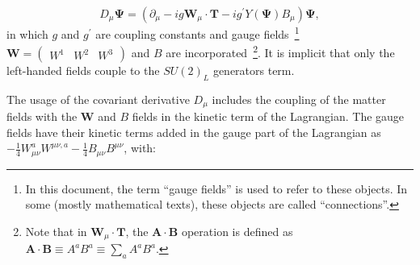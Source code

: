 \begin{equation}
\displaystyle
D_{\mu} \mathbf{\Psi} = (\partial_\mu - i g \mathbf{W}_\mu \cdot \mathbf{T} - i g^{\prime} Y(\mathbf{\Psi}) B_\mu ) \mathbf{\Psi} ,
\label{eq:dcov}
\end{equation}
in which $g$ and $g^{\prime}$ are coupling constants and
gauge fields~\footnote{In this document, the term ``gauge fields''
is used to refer to these objects. In some (mostly mathematical texts),
these objects are called ``connections''.}
$\mathbf{W} = \begin{pmatrix} W^1 & W^2 & W^3 \end{pmatrix}$ and $B$ are incorporated~\footnote{Note that in $\mathbf{W}_\mu \cdot \mathbf{T}$,
the $\mathbf{A} \cdot \mathbf{B}$ operation is defined as $\mathbf{A} \cdot \mathbf{B} \equiv A^a B^a \equiv \sum_a A^a B^a$.}.
It is implicit
that only the left-handed fields couple to the $SU(2)_L$ generators term.
%

The usage of the covariant derivative $D_{\mu}$ includes
the coupling of the matter fields with the $\mathbf{W}$ and $B$ fields in the kinetic term of the Lagrangian.
The gauge fields have their kinetic terms added in the gauge part of the Lagrangian as $- \frac{1}{4} W_{\mu \nu}^a W^{\mu \nu,a} - \frac{1}{4} B_{\mu \nu} B^{\mu \nu}$, with:

